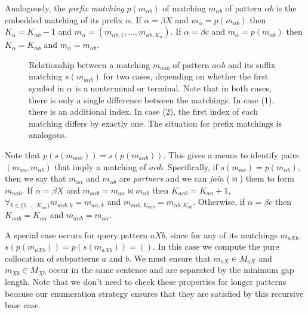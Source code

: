 Analogously, the {\em prefix matching} $p(m_{\alpha{}b})$ of 
matching $m_{\alpha{}b}$ of pattern $\alpha{}b$ is 
the embedded matching of its prefix $\alpha$.
If $\alpha = \beta{}X$ and $m_{\alpha} = p(m_{\alpha{}b})$
then $K_{\alpha} = K_{\alpha{}b}-1$ and 
$m_\alpha = (m_{\alpha{}b,1},...,m_{\alpha{}b,K_{\alpha}})$.
If $\alpha = \beta{}c$ and $m_{\alpha} = p(m_{\alpha{}b})$
then $K_{\alpha} = K_{\alpha{}b}$ and $m_{\alpha} = m_{\alpha{}b}$.

\figpreamble
\begin{figure}
	\figfontsize{
	\begin{center}
		
	\end{center}}
	\figpostamble
	\caption[Relationship between a matching $m{_{a\alpha{}b}}$ of pattern $a\alpha{}b$ and its suffix matching $s(m_{a\alpha{}b})$.]{Relationship between a matching $m{_{a\alpha{}b}}$ of pattern $a\alpha{}b$ and its suffix matching $s(m_{a\alpha{}b})$ for two cases, depending on whether the first symbol in $\alpha$ is a nonterminal or terminal.  Note that in both cases, there is only a single difference between the matchings.  In case (1), there is an additional index.  In case (2), the first index of each matching differs by exactly one.  The situation for prefix matchings is analogous.}
	\label{fig:matching-relationships}
\end{figure}

Note that $p(s(m_{a\alpha{}b})) = s(p(m_{a\alpha{}b}))$.
This gives a means to identify pairs $(m_{a\alpha}, m_{\alpha{}b})$
that imply a matching of $a\alpha{}b$.  Specifically, if 
$s(m_{a\alpha}) = p(m_{\alpha{}b})$, then we say that
$m_{a\alpha}$ and $m_{\alpha{}b}$ are {\em partners}
and we can {\em join} ($\bowtie$) them to form $m_{a\alpha{}b}$.
If $\alpha=\beta{}X$ and $m_{a\alpha{}b} = m_{a\alpha} \bowtie m_{\alpha{}b}$ 
then $K_{a\alpha{}b} = K_{a\alpha}+1$,
$\forall_{k \in \{1,...,K_{a\alpha}\}} m_{a\alpha{}b,k} = m_{a\alpha,k}$
and $m_{a\alpha{}b,K_{a\alpha{}b}} = m_{\alpha{}b,K_{\alpha{}b}}$.
Otherwise, if $\alpha=\beta{}c$ then $K_{a\alpha{}b} = K_{a\alpha}$
and $m_{a\alpha{}b} = m_{a\alpha}$.

A special case occurs for query pattern $aXb$, since
for any of its matchings $m_{aXb}$, $s(p(m_{aXb})) = p(s(m_{aXb})) = ()$.
In this case we compute the pure collocation of subpatterns
$a$ and $b$.  We must ensure that $m_{aX} \in M_{aX}$
and $m_{Xb} \in M_{Xb}$ occur in the same sentence and are separated by the
minimum gap length.  Note that we don't need to check these properties
for longer patterns because our enumeration strategy ensures
that they are satisfied by this recursive base case.

